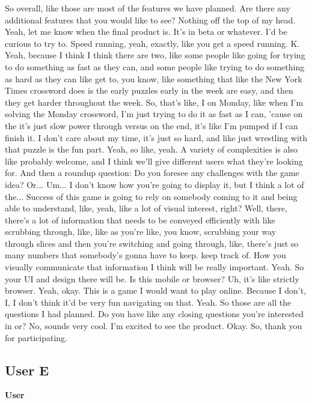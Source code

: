 \documentclass{article}
\begin{document}
So overall, like those are most of the features we have planned. Are there any additional features that you would like to see?
Nothing off the top of my head.
Yeah, let me know when the final product is. It's in beta or whatever. I'd be curious to try to.
Speed running, yeah, exactly, like you get a speed running.
K.
Yeah, because I think I think there are two, like some people like going for trying to do something as fast as they can, and some people like trying to do something as hard as they can like get to, you know, like something that like the New York Times crossword does is the early puzzles early in the week are easy, and then they get harder throughout the week.
So, that's like, I on Monday, like when I'm solving the Monday crossword, I'm just trying to do it as fast as I can, 'cause on the it's just slow power through versus on the end, it's like I'm pumped if I can finish it. I don't care about my time, it's just so hard, and like just wrestling with that puzzle is the fun part. Yeah, so like, yeah.
A variety of complexities is also like probably welcome, and I think we'll give different users what they're looking for.
And then a roundup question: Do you foresee any challenges with the game idea?
Or...
Um...
I don't know how you're going to display it, but I think a lot of the...
Success of this game is going to rely on somebody coming to it and being able to understand, like, yeah, like a lot of visual interest, right? Well, there, there's a lot of information that needs to be conveyed efficiently with like scrubbing through, like, like as you're like, you know, scrubbing your way through slices and then you're switching and going through, like, there's just so many numbers that somebody's gonna have to keep.
keep track of.
How you visually communicate that information I think will be really important.
Yeah. So your UI and design there will be. Is this mobile or browser? Uh, it's like strictly browser. Yeah, okay. This is a game I would want to play online.
Because I don't, I, I don't think it'd be very fun navigating on that.
Yeah.
So those are all the questions I had planned. Do you have like any closing questions you're interested in or? No, sounds very cool. I'm excited to see the product. Okay.
So, thank you for participating.

\newpage

\subsection{User E}

\noindent \textbf{User}
\end{document}
